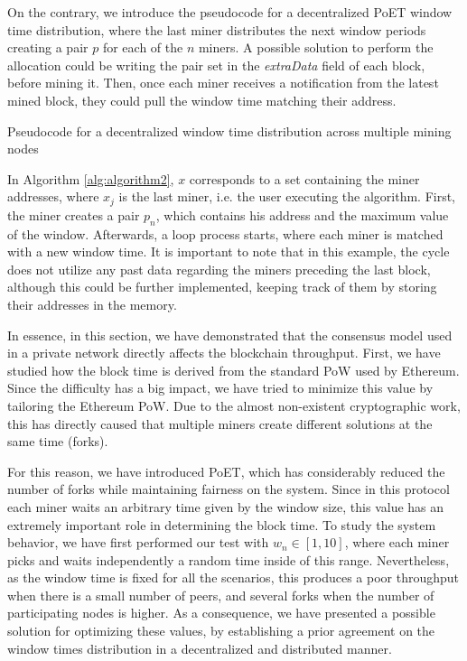 On the contrary, we introduce the pseudocode for a decentralized PoET window time distribution, where the last miner distributes the next window periods creating a pair $p$ for each of the $n$ miners. A possible solution to perform the allocation could be writing the pair set in the \textit{extraData} field of each block, before mining it. Then, once each miner receives a notification from the latest mined block, they could pull the window time matching their address.

 \begin{algorithm}
  \caption{Pseudocode for a decentralized window time distribution across multiple mining nodes}
 \label{alg:algorithm2}
  \begin{algorithmic}[1]
  \ENDFOR
 \end{algorithmic}
\end{algorithm}

In Algorithm \ref{alg:algorithm2}, $x$ corresponds to a set containing the miner addresses, where $x_j$ is the last miner, i.e. the user executing the algorithm. First, the miner creates a pair $p_n$, which contains his address and the maximum value of the window. Afterwards, a loop process starts, where each miner is matched with a new window time. It is important to note that in this example, the cycle does not utilize any past data regarding the miners preceding the last block, although this could be further implemented, keeping track of them by storing their addresses in the memory.

In essence, in this section, we have demonstrated that the consensus model used in a private network directly affects the blockchain throughput. First, we have studied how the block time is derived from the standard PoW used by Ethereum. Since the difficulty has a big impact, we have tried to minimize this value by tailoring the Ethereum PoW. Due to the almost non-existent cryptographic work, this has directly caused that multiple miners create different solutions at the same time (forks). 

For this reason, we have introduced PoET, which has considerably reduced the number of forks while maintaining fairness on the system. Since in this protocol each miner waits an arbitrary time given by the window size, this value has an extremely important role in determining the block time. To study the system behavior, we have first performed our test with $w_n \in [1,10]$, where each miner picks and waits independently a random time inside of this range. Nevertheless, as the window time is fixed for all the scenarios, this produces a poor throughput when there is a small number of peers, and several forks when the number of participating nodes is higher. As a consequence, we have presented a possible solution for optimizing these values, by establishing a prior agreement on the window times distribution in a decentralized and distributed manner.

